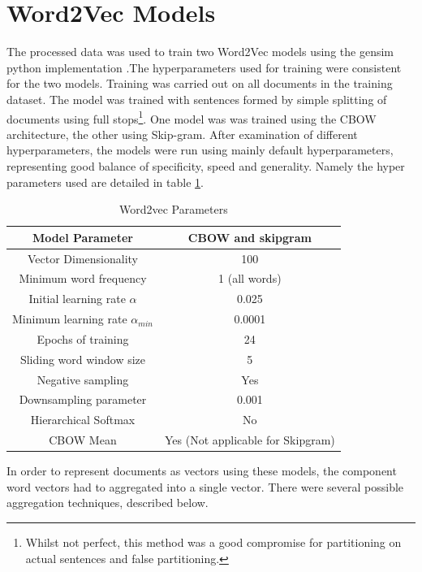\section{Word2Vec Models}
The processed data was used to train two Word2Vec models using the gensim python implementation \cite{gensim}.The hyperparameters used for training were consistent for the two models.
Training was carried out on all documents in the training dataset. The model was trained with sentences formed by simple splitting of documents using full stops\footnote{Whilst not perfect, this method was a good compromise for partitioning on actual sentences and false partitioning.}. One model was was trained using the CBOW architecture, the other using Skip-gram. After examination of different hyperparameters, the models were run using mainly default hyperparameters, representing good balance of specificity, speed and generality\cite{gensim}. Namely the hyper parameters used are detailed in table \ref{tab:hyperparams}.
\begin{table}[h!]
\begin{center}
\label{tab:hyperparams}
\caption{Word2vec Parameters}
\begin{tabular}{||c|c||}
\hline
Model Parameter &CBOW and skipgram\\
\hline
Vector Dimensionality & 100\\
Minimum word frequency & 1 (all words)\\
Initial learning rate $\alpha$ & 0.025 \\
Minimum learning rate $\alpha_{min}$&0.0001\\
Epochs of training & 24\\
Sliding word window size & 5\\
Negative sampling & Yes \\
Downsampling parameter & 0.001\\
Hierarchical Softmax & No\\
CBOW Mean & Yes (Not applicable for Skipgram) \\
\hline
\end{tabular}
\end{center}
\end{table}
In order to represent documents as vectors using these models, the component word vectors had to aggregated into a single vector. There were several possible aggregation techniques, described below.
